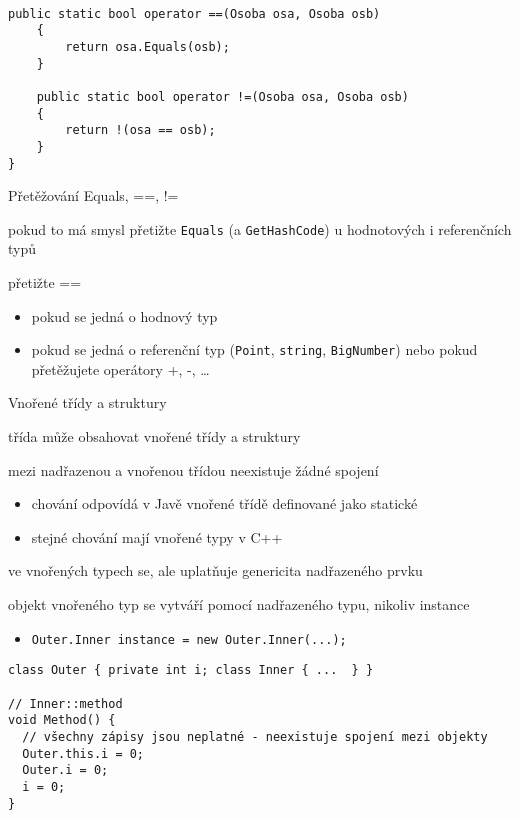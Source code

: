 \begin{frame}[fragile]
\vfill
\begin{bonusblock}{~}
\begin{lstlisting}[basicstyle=\small]
	public static bool operator ==(Osoba osa, Osoba osb)
	{
	    return osa.Equals(osb);
	}
	
	public static bool operator !=(Osoba osa, Osoba osb)
	{
	    return !(osa == osb);
	}
}
\end{lstlisting}
\end{bonusblock}
\vfill
\begin{bitemize}{Přetěžování Equals, ==, !=}
\item pokud to má smysl přetižte \lstinline|Equals| (a \lstinline|GetHashCode|) u hodnotových i referenčních typů
\item přetižte ==
\begin{itemize}
\item pokud se jedná o hodnový typ
\item pokud se jedná o referenční  typ (\lstinline|Point|, \lstinline|string|, \lstinline|BigNumber|) nebo pokud přetěžujete operátory +, -, \ldots
\end{itemize}
\end{bitemize}
\vfill
\end{frame}



\begin{frame}[fragile]
\begin{bitemize}{Vnořené třídy a struktury}
\item třída může obsahovat vnořené třídy a struktury
\item mezi nadřazenou a vnořenou třídou neexistuje žádné spojení
\begin{itemize}
\item chování odpovídá v Javě vnořené třídě definované jako statické
\item stejné chování mají vnořené typy v C++
\end{itemize}

\item ve vnořených typech se, ale uplatňuje genericita nadřazeného prvku
\item objekt vnořeného typ se vytváří pomocí nadřazeného typu, nikoliv instance
\begin{itemize}
\item \lstinline|Outer.Inner instance = new Outer.Inner(...);|
\end{itemize}

\end{bitemize}
\vfill
\begin{noblock}
\begin{lstlisting}
class Outer { private int i; class Inner { ...  } }

// Inner::method
void Method() {
  // všechny zápisy jsou neplatné - neexistuje spojení mezi objekty
  Outer.this.i = 0;
  Outer.i = 0;
  i = 0;
}
\end{lstlisting}
\end{noblock}
\end{frame}




